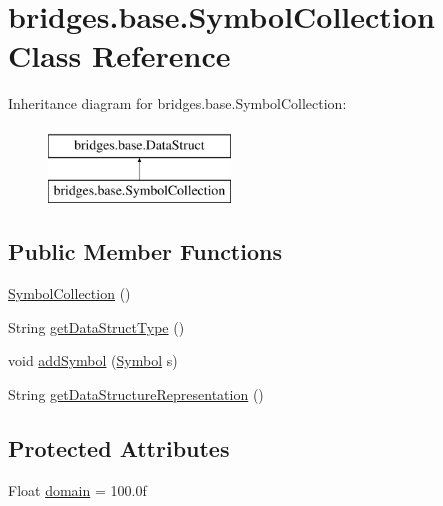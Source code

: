 \hypertarget{classbridges_1_1base_1_1_symbol_collection}{}\section{bridges.\+base.\+Symbol\+Collection Class Reference}
\label{classbridges_1_1base_1_1_symbol_collection}
Inheritance diagram for bridges.\+base.\+Symbol\+Collection\+:\begin{figure}[H]
\begin{center}
\leavevmode
\includegraphics[height=2.000000cm]{classbridges_1_1base_1_1_symbol_collection}
\end{center}
\end{figure}
\subsection*{Public Member Functions}
\begin{DoxyCompactItemize}
\item 
\hyperlink{classbridges_1_1base_1_1_symbol_collection_a8959dab963ce54f56560c6c27a3a3de5}{Symbol\+Collection} ()
\item 
String \hyperlink{classbridges_1_1base_1_1_symbol_collection_afbc928d2e6818edec96d10f52feebacb}{get\+Data\+Struct\+Type} ()
\item 
void \hyperlink{classbridges_1_1base_1_1_symbol_collection_a8e934c53b78b05a7e982f3ff2362adea}{add\+Symbol} (\hyperlink{classbridges_1_1base_1_1_symbol}{Symbol} s)
\item 
String \hyperlink{classbridges_1_1base_1_1_symbol_collection_a706ad8a7bcf12c194403ac3281c73674}{get\+Data\+Structure\+Representation} ()
\end{DoxyCompactItemize}
\subsection*{Protected Attributes}
\begin{DoxyCompactItemize}
\item 
Float \hyperlink{classbridges_1_1base_1_1_symbol_collection_a7624e96d2a4b5b6264791eb8dacbd350}{domain} = 100.\+0f
\end{DoxyCompactItemize}


